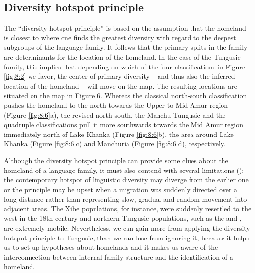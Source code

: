 \documentclass[output=paper,colorlinks,citecolor=brown]{langscibook}
\begin{document}

\subsection{Diversity hotspot principle}\label{Section8.4.2}

The “diversity hotspot principle” is based on the assumption that the homeland is closest to where one finds the greatest diversity with regard to the deepest subgroups of the language family. It follows that the primary splits in the family are determinants for the location of the homeland. In the case of the Tungusic family, this implies that depending on which of the four classifications in Figure \ref{fig:8:2} we favor, the center of primary diversity – and thus also the inferred location of the homeland – will move on the map. The resulting locations are situated on the map in Figure 6. Whereas the classical north-south classification pushes the homeland to the north towards the Upper to Mid Amur region (Figure \ref{fig:8:6}a), the revised north-south, the Manchu-Tungusic and the quadruple classifications pull it more southwards towards the Mid Amur region immediately north of Lake Khanka (Figure \ref{fig:8:6}b), the area around Lake Khanka (Figure \ref{fig:8:6}c) and Manchuria (Figure \ref{fig:8:6}d), respectively. 

Although the diversity hotspot principle can provide some clues about the homeland of a language family, it must also contend with several limitations (\citealt{WangRobbeets2020}): the contemporary hotspot of linguistic diversity may diverge from the earlier one or the principle may be upset when a migration was suddenly directed over a long distance rather than representing slow, gradual and random movement into adjacent areas. The Xibe populations, for instance, were suddenly resettled to the west in the 18th century and northern Tungusic populations, such as the  and , are extremely mobile. Nevertheless, we can gain more from applying the diversity hotspot principle to Tungusic, than we can lose from ignoring it, because it helps us to set up hypotheses about homelands and it makes us aware of the interconnection between internal family structure and the identification of a homeland.\largerpage[1.5]
\end{document}

